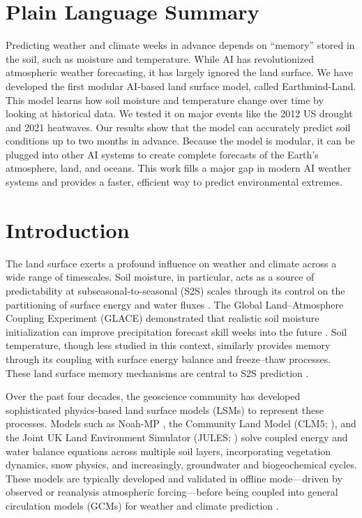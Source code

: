 \documentclass[11pt]{article}
\begin{document}
\section*{Plain Language Summary}
Predicting weather and climate weeks in advance depends on ``memory'' stored in the soil, such as moisture and temperature. While AI has revolutionized atmospheric weather forecasting, it has largely ignored the land surface. We have developed the first modular AI-based land surface model, called Earthmind-Land. This model learns how soil moisture and temperature change over time by looking at historical data. We tested it on major events like the 2012 US drought and 2021 heatwaves. Our results show that the model can accurately predict soil conditions up to two months in advance. Because the model is modular, it can be plugged into other AI systems to create complete forecasts of the Earth's atmosphere, land, and oceans. This work fills a major gap in modern AI weather systems and provides a faster, efficient way to predict environmental extremes.

\section{Introduction}
\label{sec:intro}

The land surface exerts a profound influence on weather and climate across a wide range of timescales. Soil moisture, in particular, acts as a source of predictability at subseasonal-to-seasonal (S2S) scales through its control on the partitioning of surface energy and water fluxes \citep{koster2004glace, seneviratne2010landclimate, dirmeyer2011landatm}. The Global Land--Atmosphere Coupling Experiment (GLACE) demonstrated that realistic soil moisture initialization can improve precipitation forecast skill weeks into the future \citep{koster2004glace}. Soil temperature, though less studied in this context, similarly provides memory through its coupling with surface energy balance and freeze--thaw processes. These land surface memory mechanisms are central to S2S prediction \citep{vitart2017s2s, merryfield2020s2s}.

Over the past four decades, the geoscience community has developed sophisticated physics-based land surface models (LSMs) to represent these processes. Models such as Noah-MP \citep{niu2011noahmp, ek2003noah}, the Community Land Model (CLM5; \citealt{lawrence2019clm5}), and the Joint UK Land Environment Simulator (JULES; \citealt{best2011jules}) solve coupled energy and water balance equations across multiple soil layers, incorporating vegetation dynamics, snow physics, and increasingly, groundwater and biogeochemical cycles. These models are typically developed and validated in offline mode---driven by observed or reanalysis atmospheric forcing---before being coupled into general circulation models (GCMs) for weather and climate prediction \citep{bauer2015quietrev}.
\end{document}
